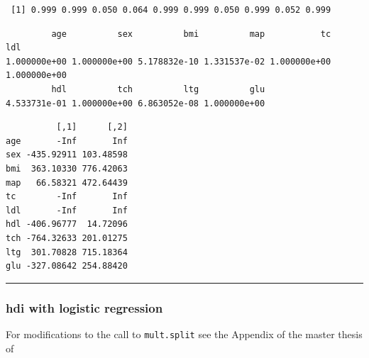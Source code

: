 \documentclass[
  letterpaper,
  DIV=11,
  numbers=noendperiod]{scrartcl}
\newenvironment{Shaded}{\begin{snugshade}}{\end{snugshade}}
\newcommand{\CommentTok}[1]{\textcolor[rgb]{0.37,0.37,0.37}{#1}}
\newcommand{\FunctionTok}[1]{\textcolor[rgb]{0.28,0.35,0.67}{#1}}
\newcommand{\NormalTok}[1]{\textcolor[rgb]{0.00,0.23,0.31}{#1}}
\newcommand{\SpecialCharTok}[1]{\textcolor[rgb]{0.37,0.37,0.37}{#1}}
\begin{document}
\begin{verbatim}
 [1] 0.999 0.999 0.050 0.064 0.999 0.999 0.050 0.999 0.052 0.999
\end{verbatim}

\begin{Shaded}
\end{Shaded}

\begin{verbatim}
         age          sex          bmi          map           tc          ldl 
1.000000e+00 1.000000e+00 5.178832e-10 1.331537e-02 1.000000e+00 1.000000e+00 
         hdl          tch          ltg          glu 
4.533731e-01 1.000000e+00 6.863052e-08 1.000000e+00 
\end{verbatim}

\begin{Shaded}
\end{Shaded}

\begin{verbatim}
          [,1]      [,2]
age       -Inf       Inf
sex -435.92911 103.48598
bmi  363.10330 776.42063
map   66.58321 472.64439
tc        -Inf       Inf
ldl       -Inf       Inf
hdl -406.96777  14.72096
tch -764.32633 201.01275
ltg  301.70828 715.18364
glu -327.08642 254.88420
\end{verbatim}

\normalsize

\begin{center}\rule{0.5\linewidth}{0.5pt}\end{center}

\hypertarget{hdi-with-logistic-regression}{%
\subsubsection{hdi with logistic
regression}\label{hdi-with-logistic-regression}}

For modifications to the call to \texttt{mult.split} see the Appendix of
the master thesis of
\end{document}
